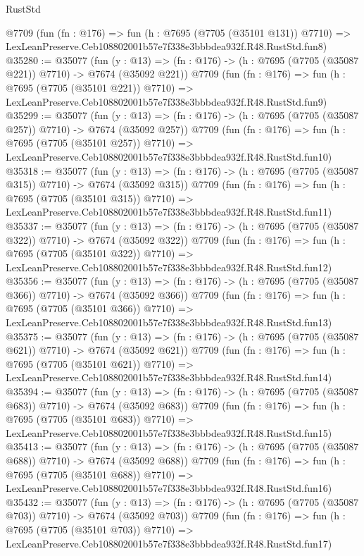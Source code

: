 \begin{lexlean}{RustStd}
\begin{coremodule}
    @7709
    (fun (fn : @176) =>
    fun (h : @7695 (@7705 (@35101 @131)) @7710) =>
    LexLeanPreserve.Ceb108802001b57e7f338e3bbbdea932f.R48.RustStd.fun8)
@35280 := @35077
    (fun (y : @13) => (fn : @176) -> (h : @7695 (@7705 (@35087 @221)) @7710) -> @7674 (@35092 @221))
    @7709
    (fun (fn : @176) =>
    fun (h : @7695 (@7705 (@35101 @221)) @7710) =>
    LexLeanPreserve.Ceb108802001b57e7f338e3bbbdea932f.R48.RustStd.fun9)
@35299 := @35077
    (fun (y : @13) => (fn : @176) -> (h : @7695 (@7705 (@35087 @257)) @7710) -> @7674 (@35092 @257))
    @7709
    (fun (fn : @176) =>
    fun (h : @7695 (@7705 (@35101 @257)) @7710) =>
    LexLeanPreserve.Ceb108802001b57e7f338e3bbbdea932f.R48.RustStd.fun10)
@35318 := @35077
    (fun (y : @13) => (fn : @176) -> (h : @7695 (@7705 (@35087 @315)) @7710) -> @7674 (@35092 @315))
    @7709
    (fun (fn : @176) =>
    fun (h : @7695 (@7705 (@35101 @315)) @7710) =>
    LexLeanPreserve.Ceb108802001b57e7f338e3bbbdea932f.R48.RustStd.fun11)
@35337 := @35077
    (fun (y : @13) => (fn : @176) -> (h : @7695 (@7705 (@35087 @322)) @7710) -> @7674 (@35092 @322))
    @7709
    (fun (fn : @176) =>
    fun (h : @7695 (@7705 (@35101 @322)) @7710) =>
    LexLeanPreserve.Ceb108802001b57e7f338e3bbbdea932f.R48.RustStd.fun12)
@35356 := @35077
    (fun (y : @13) => (fn : @176) -> (h : @7695 (@7705 (@35087 @366)) @7710) -> @7674 (@35092 @366))
    @7709
    (fun (fn : @176) =>
    fun (h : @7695 (@7705 (@35101 @366)) @7710) =>
    LexLeanPreserve.Ceb108802001b57e7f338e3bbbdea932f.R48.RustStd.fun13)
@35375 := @35077
    (fun (y : @13) => (fn : @176) -> (h : @7695 (@7705 (@35087 @621)) @7710) -> @7674 (@35092 @621))
    @7709
    (fun (fn : @176) =>
    fun (h : @7695 (@7705 (@35101 @621)) @7710) =>
    LexLeanPreserve.Ceb108802001b57e7f338e3bbbdea932f.R48.RustStd.fun14)
@35394 := @35077
    (fun (y : @13) => (fn : @176) -> (h : @7695 (@7705 (@35087 @683)) @7710) -> @7674 (@35092 @683))
    @7709
    (fun (fn : @176) =>
    fun (h : @7695 (@7705 (@35101 @683)) @7710) =>
    LexLeanPreserve.Ceb108802001b57e7f338e3bbbdea932f.R48.RustStd.fun15)
@35413 := @35077
    (fun (y : @13) => (fn : @176) -> (h : @7695 (@7705 (@35087 @688)) @7710) -> @7674 (@35092 @688))
    @7709
    (fun (fn : @176) =>
    fun (h : @7695 (@7705 (@35101 @688)) @7710) =>
    LexLeanPreserve.Ceb108802001b57e7f338e3bbbdea932f.R48.RustStd.fun16)
@35432 := @35077
    (fun (y : @13) => (fn : @176) -> (h : @7695 (@7705 (@35087 @703)) @7710) -> @7674 (@35092 @703))
    @7709
    (fun (fn : @176) =>
    fun (h : @7695 (@7705 (@35101 @703)) @7710) =>
    LexLeanPreserve.Ceb108802001b57e7f338e3bbbdea932f.R48.RustStd.fun17)

\end{coremodule}
\end{lexlean}
